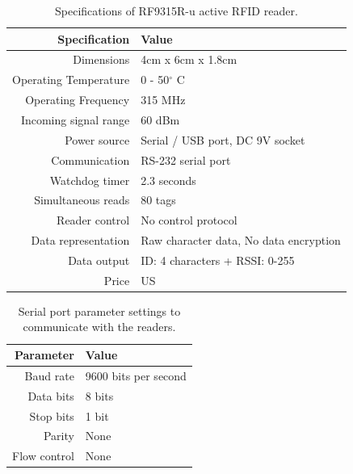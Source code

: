 \documentclass[a4paper,11pt]{scrartcl}
\begin{document}
\begin{table}[H]
	\centering
	\begin{tabular}{ | r || l | }
		\hline
		\textbf{Specification}	& \textbf{Value} \\ \hline
		Dimensions				& 4cm x 6cm x 1.8cm \\ \hline
		Operating Temperature	& 0 - 50$^\circ$ C	\\ \hline
		Operating Frequency		& 315 MHz	\\ \hline
		Incoming signal range	& 60 dBm \\ \hline
		Power source			& Serial / USB port, DC 9V socket \\ \hline
		Communication			& RS-232 serial port \\ \hline
		Watchdog timer			& 2.3 seconds \\ \hline
		Simultaneous reads		& 80 tags	\\ \hline
		Reader control			& No control protocol \\ \hline
		Data representation		& Raw character data, No data encryption	\\ \hline
		Data output				& ID: 4 characters + RSSI: 0-255 \\ \hline
		Price					& US \textdollar 49.95 \\ \hline
	\end{tabular}
	\caption{Specifications of RF9315R-u active RFID reader.}
\end{table}

\begin{table}[H]
	\centering
	\begin{tabular}{ | r || l | }
		\hline
		\textbf{Parameter}		& \textbf{Value} \\ \hline
		Baud rate				& 9600 bits per second \\ \hline
		Data bits				& 8 bits \\ \hline
		Stop bits				& 1 bit \\ \hline
		Parity					& None \\ \hline
		Flow control			& None \\ \hline
	\end{tabular}
	\caption{Serial port parameter settings to communicate with the readers.}
\end{table}
\end{document}
